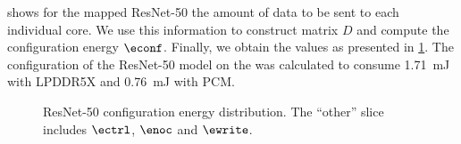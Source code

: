 
 shows for the mapped ResNet-50 the amount of data to be sent to each individual core.
We use this information to construct matrix $D$ and compute the configuration energy $\econf$.
Finally, we obtain the values as presented in \cref{fig:resnet50_conf_energy_distribution}.
The configuration of the ResNet-50 model on the \graicore{} was calculated to consume \SI{1.71}{mJ} with LPDDR5X and \SI{0.76}{mJ} with PCM.



\begin{figure}[hbtp]
    \centering
    \hfill
    \caption{ResNet-50 configuration energy distribution. The ``other'' slice includes $\ectrl$, $\enoc$ and $\ewrite$.}
    \label{fig:resnet50_conf_energy_distribution}
\end{figure}

